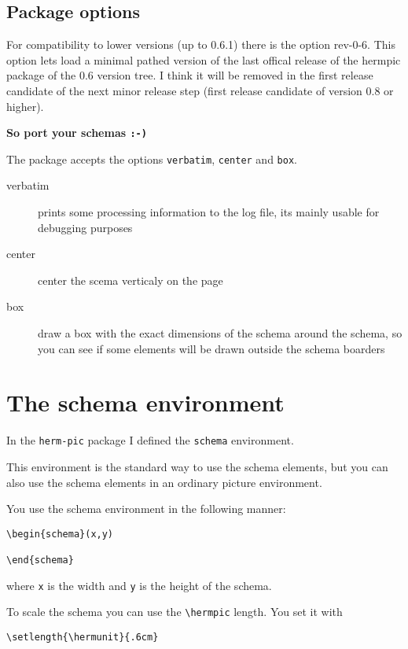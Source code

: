 \documentclass[a4paper,11pt]{article}
\begin{document}
\subsection{Package options}

For compatibility to lower versions (up to 0.6.1) there is the option
rev-0-6. This option lets load a minimal pathed version of the last offical 
release of the hermpic package of the 0.6 version tree. 
I think it will be removed in the first release candidate of the next
minor release step (first release candidate of version 0.8 or higher).

{\bf So port your schemas {\tt :-) } }

The package accepts the options {\tt verbatim}, {\tt center} and {\tt box}.

\begin{description}
\item[verbatim] prints some processing information to the log file, its mainly 
  usable for debugging purposes
\item[center] center the scema verticaly on the page
\item[box] draw a box with the exact dimensions of the schema around the schema, so you
  can see if some elements will be drawn outside the schema boarders
\end{description}

\section{The schema environment}

In the {\tt herm-pic} package I defined the {\tt schema} environment.

This environment is the standard way to use the schema elements, but you 
can also use the schema elements in an ordinary picture environment.

You use the schema environment in the following manner:

\begin{verbatim}
\begin{schema}(x,y)

\end{schema}
\end{verbatim}

where {\tt x} is the width and {\tt y} is the height of 
the schema.

To scale the schema you can use the \verb|\hermpic| length.
You set it with

\begin{verbatim}
\setlength{\hermunit}{.6cm}
\end{verbatim}
\end{document}
